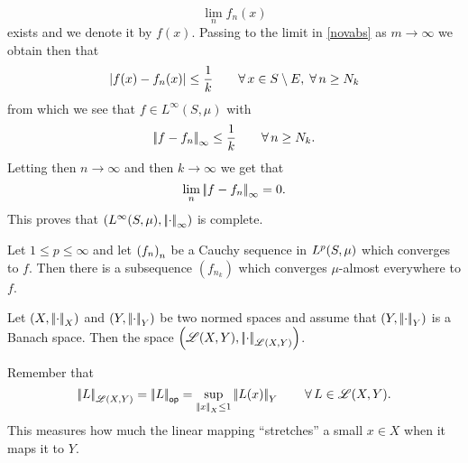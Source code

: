 \documentclass{article}
\begin{document}
\begin{fancyproof}
\begin{itemize}
\begin{equation*}
			\lim_{n}f_{n}(x)
		\end{equation*}
		exists and we denote it by $f(x)$. Passing to the limit in \ref{novabs} as $m\to\infty$ we obtain then that 
		\begin{equation*}
			\left|f(x)-f_{n}(x)\right|\leq\frac{1}{k}\qquad\forall\, x\in S\setminus E,\;\forall\, n\geq N_{k}
		\end{equation*}
		from which we see that $f\in L^{\infty}(S,\mu)$ with
		\begin{equation*}
			\left|\negthinspace\left|f-f_{n}\right|\negthinspace\right|_{\infty}\leq\frac{1}{k}\qquad\forall\, n\geq N_{k}.
		\end{equation*}
		Letting then $n\to\infty$ and then $k\to\infty$ we get that 
		\begin{equation*}
			\lim_{n}\left|\negthinspace\left|f-f_{n}\right|\negthinspace\right|_{\infty}=0.
		\end{equation*}
		This proves that $\left(L^{\infty}(S,\mu),\left|\negthinspace\left|\cdot\right|\negthinspace\right|_{\infty}\right)$ is complete.
	\end{itemize}
\end{fancyproof}
\begin{proposition}
	Let $1\leq p\leq\infty$ and let ${\left({f}_{n}\right)}_{n}$ be a Cauchy sequence in $L^{p}(S,\mu)$ which converges to $f$. Then there is a subsequence $\left(f_{n_{k}}\right)$ which converges $\mu$-almost everywhere to $f$.
\end{proposition}
\begin{proposition}
	Let $\left(X,\left|\negthinspace\left|\cdot\right|\negthinspace\right|_{X}\right)$ and $\left(Y,\left|\negthinspace\left|\cdot\right|\negthinspace\right|_{Y}\right)$ be two normed spaces and assume that $(Y,\left|\negthinspace\left|\cdot\right|\negthinspace\right|_{Y})$ is a Banach space. Then the space $\left(\mathscr{L}(X,Y),\left|\negthinspace\left|\cdot\right|\negthinspace\right|_{\mathscr{L}(X,Y)}\right)$.
\end{proposition}
Remember that 
\begin{equation*}
	\norm{L}_{\mathscr{L}(X,Y)}=\norm{L}_{\mathsf{op}}=\sup_{\norm{x}_{X}\leq 1}\norm{L(x)}_{Y}\qquad\every L\in\mathscr{L}(X,Y).
\end{equation*}
This measures how much the linear mapping ``stretches'' a small $x\in X$ when it maps it to $Y$.
\end{document}
